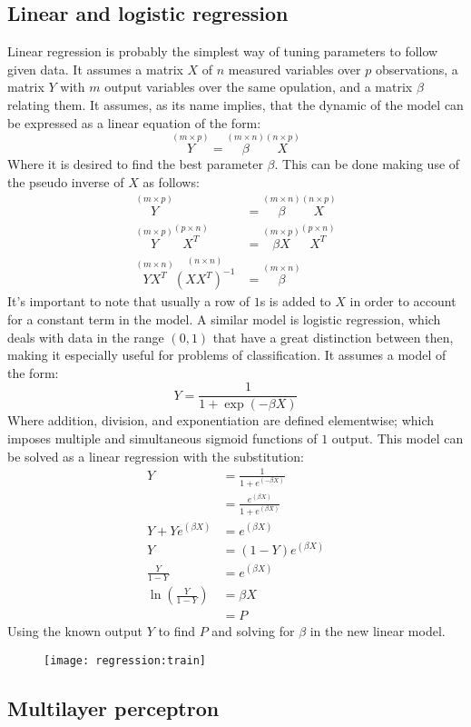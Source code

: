 \documentclass[journal]{IEEEtran}
\begin{document}
\subsection{Linear and logistic regression\label{sec:regression}}

Linear regression is probably the simplest way of tuning parameters to follow
given data. It assumes a matrix $X$ of $n$ measured variables over $p$
observations, a matrix $Y$ with $m$ output variables over the same opulation,
and a matrix $\beta$ relating them. It assumes, as its name implies, that the
dynamic of the model can be expressed as a linear equation of the form: 
%
\begin{equation}\label{eq:linear}
    \overset{(m\times p)}{Y}
    = \overset{(m\times n)}{\beta} \overset{(n\times p)}{X}
\end{equation}
%
Where it is desired to find the best parameter $\beta$. This can be done making
use of the pseudo inverse of $X$ as follows:
%
\begin{align*}
    \overset{(m\times p)}{Y}
        &= \overset{(m\times n)}{\beta} \overset{(n\times p)}{X}\\
    \overset{(m\times p)}{Y}\overset{(p\times n)}{X^T}
        &= \overset{(m\times p)}{\beta X} \overset{(p\times n)}{X^T}\nonumber\\
    \overset{(m\times n)}{Y X^T} \overset{(n\times n)}{\left(X X^T\right)^{-1}}
        &= \overset{(m\times n)}{\beta}
\end{align*}
%
It's important to note that usually a row of $1$s is added to $X$ in order to
account for a constant term in the model. A similar model is logistic
regression, which deals with data in the range $(0, 1)$ that have a great
distinction between then, making it especially useful for problems of
classification. It assumes a model of the form:
%
\begin{equation}
    Y = \frac{1}{1+\exp{(-\beta X)}}
\end{equation}
%
Where addition, division, and exponentiation are defined elementwise; which
imposes multiple and simultaneous sigmoid functions of $1$ output. 
This model can be solved as a linear regression with the substitution:
%
\begin{align*}
    Y &= \frac{1}{1+e^{(-\beta X)}}\nonumber\\
        &= \frac{e^{(\beta X)}}{1+e^{(\beta X)}}\\
    Y+Ye^{(\beta X)}
        &= e^{(\beta X)}\\
    Y &= (1-Y) e^{(\beta X)}\\
    \frac{Y}{1-Y} &= e^{(\beta X)}\\
    \ln{\left(\frac{Y}{1-Y}\right)} &= \beta X\\
        &= P
\end{align*}
%
Using the known output $Y$ to find $P$ and solving for $\beta$ in the new linear
model.

\begin{figure}[ht]
    \texttt{[image: regression:train]}
\end{figure}



\subsection{Multilayer perceptron\label{sec:nn}}

\printbibliography
\end{document}
